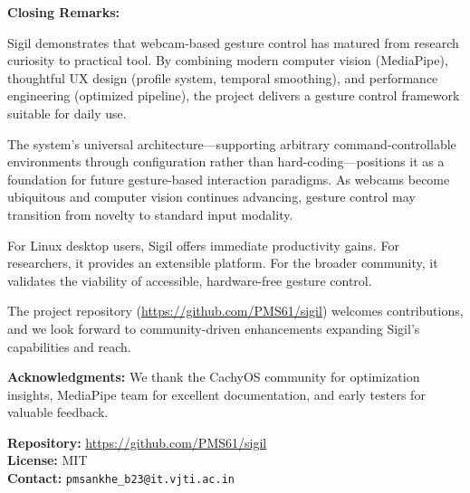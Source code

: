 \documentclass[11pt,a4paper]{article}
\begin{document}
\textbf{Closing Remarks:}

Sigil demonstrates that webcam-based gesture control has matured from research curiosity to practical tool. By combining modern computer vision (MediaPipe), thoughtful UX design (profile system, temporal smoothing), and performance engineering (optimized pipeline), the project delivers a gesture control framework suitable for daily use.

The system's universal architecture—supporting arbitrary command-controllable environments through configuration rather than hard-coding—positions it as a foundation for future gesture-based interaction paradigms. As webcams become ubiquitous and computer vision continues advancing, gesture control may transition from novelty to standard input modality.

For Linux desktop users, Sigil offers immediate productivity gains. For researchers, it provides an extensible platform. For the broader community, it validates the viability of accessible, hardware-free gesture control.

The project repository (\url{https://github.com/PMS61/sigil}) welcomes contributions, and we look forward to community-driven enhancements expanding Sigil's capabilities and reach.

\vspace{2em}
\noindent\textbf{Acknowledgments:} We thank the CachyOS community for optimization insights, MediaPipe team for excellent documentation, and early testers for valuable feedback.

\vspace{1em}
\noindent\textbf{Repository:} \url{https://github.com/PMS61/sigil} \\
\noindent\textbf{License:} MIT \\
\noindent\textbf{Contact:} \verb|pmsankhe_b23@it.vjti.ac.in|
\end{document}
